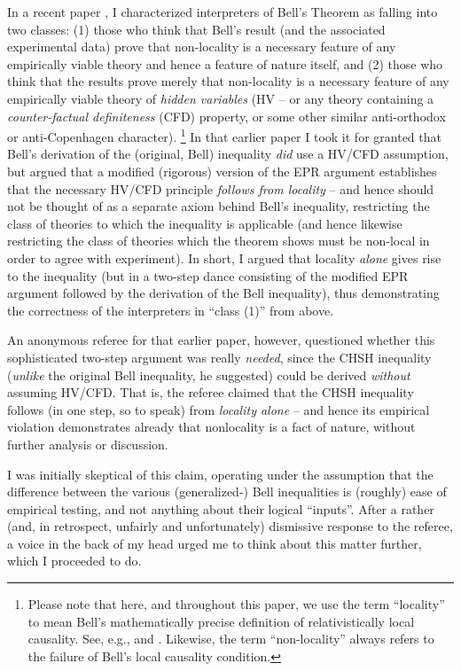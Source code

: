 \documentclass[aps,prc,onecolumn,12pt]{revtex4-2}
\begin{document}
In a recent paper \cite{nonlocchar}, 
I characterized interpreters of Bell's Theorem 
\cite{bell} as falling into two classes:  (1) those who think that
Bell's result (and the associated experimental data) prove that
non-locality is a necessary feature of any empirically viable theory
and hence a feature of nature itself, and (2) those who think that the
results prove merely that non-locality is a necessary feature of any
empirically viable theory of \emph{hidden variables} (HV -- or any theory
containing a \emph{counter-factual definiteness} (CFD) property, or some
other similar anti-orthodox or anti-Copenhagen character).  
\footnote{Please note that here, and throughout this paper, we use the
  term ``locality'' to mean Bell's
  mathematically precise definition of relativistically local
  causality.  See, e.g., \cite[pg 232-248, pg 52-62]{bell} and
  \cite{nonlocchar}.  Likewise, the term ``non-locality'' always
  refers to the failure of Bell's local causality condition.}
In that earlier paper I took it for granted that Bell's derivation of
the (original, Bell) inequality \emph{did} use a HV/CFD assumption,
but argued that a modified (rigorous) version of the EPR argument \cite{epr}
establishes that the necessary HV/CFD principle \emph{follows from
  locality} -- and hence should not be thought of as a separate axiom
behind Bell's inequality, restricting the class of theories to which
the inequality is applicable (and hence likewise restricting the class
of theories which the theorem shows must be non-local in order to agree with
experiment).  In short, I argued that locality \emph{alone} gives rise
to the inequality (but in a two-step dance consisting of the modified
EPR argument followed by the derivation of the Bell inequality), thus
demonstrating the correctness of the interpreters in ``class (1)''
from above.

An anonymous referee for that earlier paper, however, questioned
whether this sophisticated two-step argument was really \emph{needed},
since the CHSH \cite{chsh}
inequality (\emph{unlike} the original Bell inequality,
he suggested) could be derived \emph{without} assuming HV/CFD.  That
is, the referee claimed that the CHSH inequality follows (in one step,
so to speak) from \emph{locality alone} -- and hence its empirical
violation demonstrates already that nonlocality is a fact of nature,
without further analysis or discussion.  \cite{skyrms}

I was initially skeptical of this claim, operating under the
assumption that the difference between the various (generalized-) Bell
inequalities is (roughly) ease of empirical testing, and not anything
about their logical ``inputs''.  After a rather (and, in retrospect,
unfairly and unfortunately) dismissive response to the referee, a
voice in the back of my head urged me to think about this matter
further, which I proceeded to do.  
\end{document}
